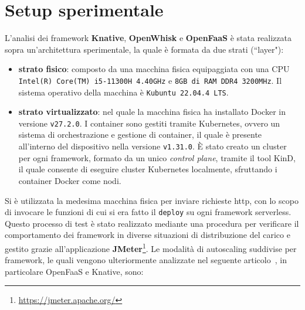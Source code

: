 \documentclass[12pt,a4paper,openany,twoside]{book}
\begin{document}
%


\chapter{Setup sperimentale}
\label{chap:setup-sperimentale}

L'analisi dei framework \textbf{Knative}, \textbf{OpenWhisk} e \textbf{OpenFaaS} è stata realizzata sopra un'architettura sperimentale, la quale è formata da due strati (``layer"):
\begin{itemize}
    \item \textbf{strato fisico}: composto da una macchina fisica equipaggiata con una CPU \\
    \texttt{Intel(R) Core(TM) i5-11300H 4.40GHz} e \texttt{8GB di RAM DDR4 3200MHz}. Il sistema operativo della macchina è \texttt{Kubuntu 22.04.4 LTS}.
    
    \item \textbf{strato virtualizzato}: nel quale la macchina fisica ha installato Docker in versione \texttt{v27.2.0}. I container sono gestiti tramite Kubernetes, ovvero un sistema di orchestrazione e gestione di container, il quale è presente all'interno del dispositivo nella versione \texttt{v1.31.0}. È stato creato un cluster per ogni framework, formato da un unico \textit{control plane}, tramite il tool KinD, il quale consente di eseguire cluster Kubernetes localmente, sfruttando i container Docker come nodi.
\end{itemize}
Si è utilizzata la medesima macchina fisica per inviare richieste \ac{http}, con lo scopo di invocare le funzioni di cui si era fatto il \texttt{deploy} su ogni framework serverless. Questo processo di test è stato realizzato mediante una procedura per verificare il comportamento dei framework in diverse situazioni di distribuzione del carico e gestito grazie all'applicazione \textbf{JMeter}\footnote{\url{https://jmeter.apache.org/}}. Le modalità di autoscaling suddivise per framework, le quali vengono ulteriormente analizzate nel seguente articolo~\cite{Li2021}, in particolare OpenFaaS e Knative, sono:
\end{document}
